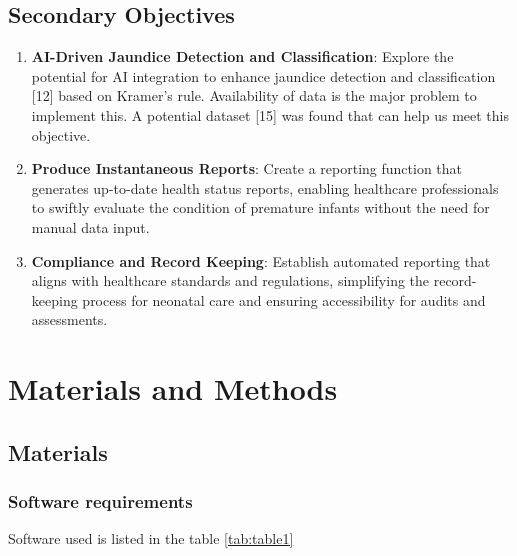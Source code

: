 \documentclass{article}
\begin{document}
\subsection{Secondary Objectives}\label{secondary-objectives}

\begin{enumerate}
\def\labelenumi{\arabic{enumi}.}
\item
  \textbf{AI-Driven Jaundice Detection and Classification}: Explore the
  potential for AI integration to enhance jaundice detection and
  classification {[}12{]} based on Kramer's rule. Availability of data
  is the major problem to implement this. A potential dataset {[}15{]}
  was found that can help us meet this objective.
\item
  \textbf{Produce Instantaneous Reports}: Create a reporting function
  that generates up-to-date health status reports, enabling healthcare
  professionals to swiftly evaluate the condition of premature infants
  without the need for manual data input.
\item
  \textbf{Compliance and Record Keeping}: Establish automated reporting
  that aligns with healthcare standards and regulations, simplifying the
  record-keeping process for neonatal care and ensuring accessibility
  for audits and assessments.
\end{enumerate}

\section{Materials and Methods}\label{materials-and-methods}

\subsection{Materials}\label{materials}

\subsubsection{Software requirements}\label{software-requirements}

Software used is listed in the table \ref{tab:table1}
\end{document}

